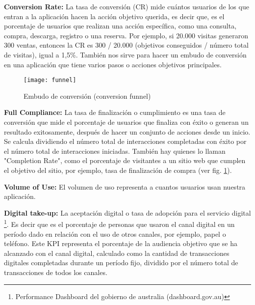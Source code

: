 \begin{description}
  \item {\textbf{Conversion Rate:} La tasa de conversión (CR) mide cuántos usuarios de los que entran a la aplicación hacen la acción objetivo querida, es decir que, es el porcentaje de usuarios que realizan una acción específica, como una consulta, compra, descarga, registro o una reserva. Por ejemplo, si 20.000 visitas generaron 300 ventas, entonces la CR es 300 / 20.000 (objetivos conseguidos / número total de visitas), igual a 1,5\%. También nos sirve para hacer un embudo de conversión en una aplicación que tiene varios pasos o acciones objetivos principales.
}

\begin{figure}[h]
  \centering
  \texttt{[image: funnel]}
  \caption{Embudo de conversión (conversion funnel)}
  \centering
  \label{fig:funnel} %
\end{figure}
\FloatBarrier %


  \item {\textbf{Full Compliance:} La tasa de finalización o cumplimiento es una tasa de conversión que mide el porcentaje de usuarios que finaliza con éxito o generan un resultado exitosamente, después de hacer un conjunto de acciones desde un inicio. Se calcula dividiendo el número total de interacciones completadas con éxito por el número total de interacciones iniciadas. También hay quienes lo llaman "Completion Rate", como el porcentaje de visitantes a un sitio web que cumplen el objetivo del sitio, por ejemplo, tasa de finalización de compra (ver fig. \ref{fig:funnel}). 
}

  \item {\textbf{Volume of Use:} El volumen de uso representa a cuantos usuarios usan nuestra aplicación.
}

  \item {\textbf{Digital take-up:} La aceptación digital o tasa de adopción para el servicio digital \footnote{Performance Dashboard del gobierno de australia (dashboard.gov.au)}. Es decir que es el porcentaje de personas que usaron el canal digital en un período dado en relación con el uso de otros canales, por ejemplo, papel o teléfono. Este KPI representa el porcentaje de la audiencia objetivo que se ha alcanzado con el canal digital, calculado como la cantidad de transacciones digitales completadas durante un período fijo, dividido por el número total de transacciones de todos los canales.
}


\end{description}
